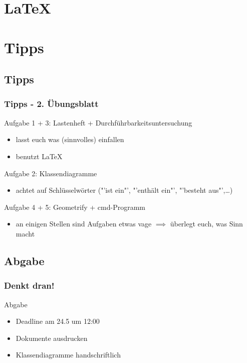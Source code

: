 \documentclass[18pt]{beamer}
\begin{document}
		
\section{\LaTeX}
		
\section{Tipps}
	\subsection{Tipps}
	\begin{frame}
		\frametitle{Tipps - 2. Übungsblatt}
		\begin{small}
			\begin{exampleblock}{Aufgabe 1 + 3: Lastenheft + Durchführbarkeitsuntersuchung}
				\begin{itemize}
					\item lasst euch was (sinnvolles) einfallen
					\item benutzt \LaTeX
				\end{itemize}
			\end{exampleblock}
			\pause
			\begin{exampleblock}{Aufgabe 2: Klassendiagramme}
				\begin{itemize}
					\item achtet auf Schlüsselwörter ("'ist ein"', "'enthält ein"', "'besteht aus"',\dots)
				\end{itemize}
			\end{exampleblock}
			\pause
			\begin{exampleblock}{Aufgabe 4 + 5: Geometrify + cmd-Programm}
				\begin{itemize}
					\item an einigen Stellen sind Aufgaben etwas vage
					\linebreak $\implies$ überlegt euch, was Sinn macht
				\end{itemize}
			\end{exampleblock}
		\end{small}
	\end{frame}
	
	\subsection{Abgabe}
	\begin{frame}
		\frametitle{Denkt dran!}
		\begin{alertblock}{Abgabe}
			\begin{itemize}
				\item Deadline am 24.5 um 12:00
				\item Dokumente ausdrucken
				\item Klassendiagramme handschriftlich
			\end{itemize}
		\end{alertblock}
	\end{frame}
		
\end{document}
